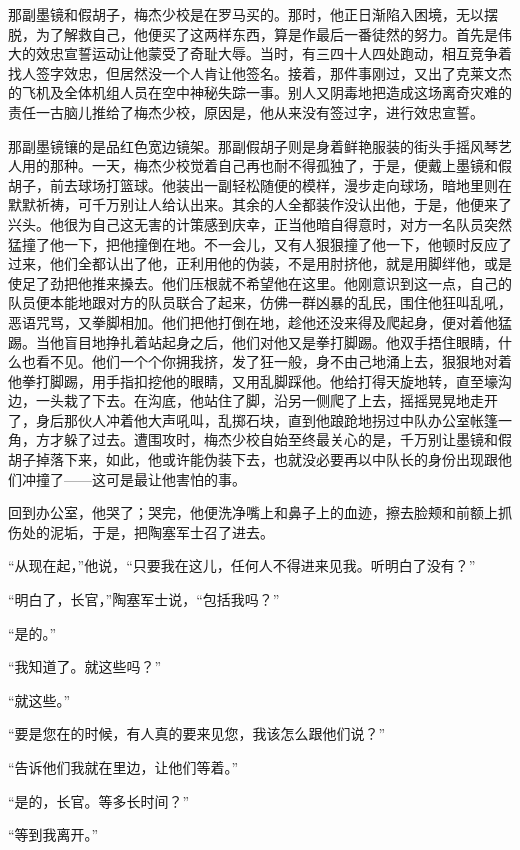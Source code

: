     那副墨镜和假胡子，梅杰少校是在罗马买的。那时，他正日渐陷入困境，无以摆脱，为了解救自己，他便买了这两样东西，算是作最后一番徒然的努力。首先是伟大的效忠宣誓运动让他蒙受了奇耻大辱。当时，有三四十人四处跑动，相互竞争着找人签字效忠，但居然没一个人肯让他签名。接着，那件事刚过，又出了克莱文杰的飞机及全体机组人员在空中神秘失踪一事。别人又阴毒地把造成这场离奇灾难的责任一古脑儿推给了梅杰少校，原因是，他从来没有签过字，进行效忠宣誓。

    那副墨镜镶的是品红色宽边镜架。那副假胡子则是身着鲜艳服装的街头手摇风琴艺人用的那种。一天，梅杰少校觉着自己再也耐不得孤独了，于是，便戴上墨镜和假胡子，前去球场打篮球。他装出一副轻松随便的模样，漫步走向球场，暗地里则在默默祈祷，可千万别让人给认出来。其余的人全都装作没认出他，于是，他便来了兴头。他很为自己这无害的计策感到庆幸，正当他暗自得意时，对方一名队员突然猛撞了他一下，把他撞倒在地。不一会儿，又有人狠狠撞了他一下，他顿时反应了过来，他们全都认出了他，正利用他的伪装，不是用肘挤他，就是用脚绊他，或是使足了劲把他推来搡去。他们压根就不希望他在这里。他刚意识到这一点，自己的队员便本能地跟对方的队员联合了起来，仿佛一群凶暴的乱民，围住他狂叫乱吼，恶语咒骂，又拳脚相加。他们把他打倒在地，趁他还没来得及爬起身，便对着他猛踢。当他盲目地挣扎着站起身之后，他们对他又是拳打脚踢。他双手捂住眼睛，什么也看不见。他们一个个你拥我挤，发了狂一般，身不由己地涌上去，狠狠地对着他拳打脚踢，用手指扣挖他的眼睛，又用乱脚踩他。他给打得天旋地转，直至壕沟边，一头栽了下去。在沟底，他站住了脚，沿另一侧爬了上去，摇摇晃晃地走开了，身后那伙人冲着他大声吼叫，乱掷石块，直到他踉跄地拐过中队办公室帐篷一角，方才躲了过去。遭围攻时，梅杰少校自始至终最关心的是，千万别让墨镜和假胡子掉落下来，如此，他或许能伪装下去，也就没必要再以中队长的身份出现跟他们冲撞了——这可是最让他害怕的事。

    回到办公室，他哭了；哭完，他便洗净嘴上和鼻子上的血迹，擦去脸颊和前额上抓伤处的泥垢，于是，把陶塞军士召了进去。

    “从现在起，”他说，“只要我在这儿，任何人不得进来见我。听明白了没有？”

    “明白了，长官，”陶塞军士说，“包括我吗？”

    “是的。”

    “我知道了。就这些吗？”

    “就这些。”

    “要是您在的时候，有人真的要来见您，我该怎么跟他们说？”

    “告诉他们我就在里边，让他们等着。”

    “是的，长官。等多长时间？”

    “等到我离开。”

